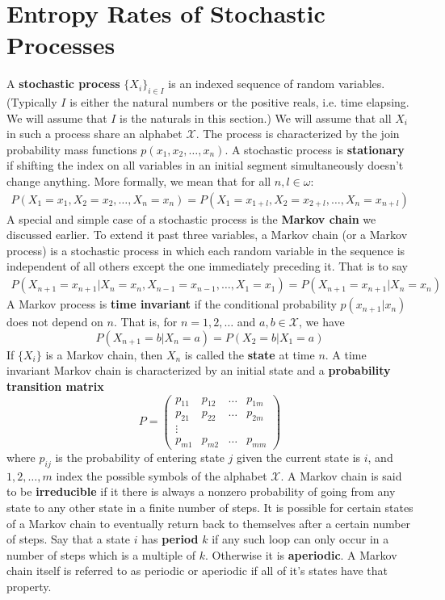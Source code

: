 \documentclass{article}
\theoremstyle{definition}
\theoremstyle{plain}
\begin{document}
\section{Entropy Rates of Stochastic Processes}
A \textbf{stochastic process} $\{X_i\}_{i \in I}$ is an indexed sequence of random variables. (Typically $I$ is either the natural numbers or the positive reals, i.e. time elapsing. We will assume that $I$ is the naturals in this section.) We will assume that all $X_i$ in such a process share an alphabet $\mathcal{X}$. The process is characterized by the join probability mass functions $p(x_1,x_2,\ldots,x_n)$. A stochastic process is \textbf{stationary} if shifting the index on all variables in an initial segment simultaneously doesn't change anything. More formally, we mean that for all $n,l \in \omega$:
\begin{align}
	P(X_1 = x_1,X_2 = x_2,\ldots,X_n = x_n) = P(X_1 = x_{1+l},X_2 = x_{2+l},\ldots,X_n = x_{n+l})
\end{align} 
A special and simple case of a stochastic process is the \textbf{Markov chain} we discussed earlier. To extend it past three variables, a Markov chain (or a Markov process) is a stochastic process in which each random variable in the sequence is independent of all others except the one immediately preceding it. That is to say
\begin{align}
	P(X_{n+1} = x_{n+1}|X_n = x_n,X_{n-1}=x_{n-1},\ldots,X_1 = x_1) = P(X_{n+1}=x_{n+1}|X_n = x_n)
\end{align}
A Markov process is \textbf{time invariant} if the conditional probability $p(x_{n+1}|x_n)$ does not depend on $n$. That is, for $n=1,2,\ldots$ and $a,b\in \mathcal{X}$, we have
\[ P(X_{n+1}=b|X_n=a) = P(X_2=b|X_1=a) \]
If $\{X_i\}$ is a Markov chain, then $X_n$ is called the \textbf{state} at time $n$. A time invariant Markov chain is characterized by an initial state and a \textbf{probability transition matrix}
\[ P = \begin{pmatrix} p_{11} & p_{12} & \ldots & p_{1m} \\
						p_{21} & p_{22} & \ldots & p_{2m} \\
						\vdots \\
						p_{m1} & p_{m2} & \ldots & p_{mm} \end{pmatrix} \]
where $p_{ij}$ is the probability of entering state $j$ given the current state is $i$, and $1,2,\ldots,m$ index the possible symbols of the alphabet $\mathcal{X}$. A Markov chain is said to be \textbf{irreducible} if it there is always a nonzero probability of going from any state to any other state in a finite number of steps. It is possible for certain states of a Markov chain to eventually return back to themselves after a certain number of steps. Say that a state $i$ has \textbf{period} $k$ if any such loop can only occur in a number of steps which is a multiple of $k$. Otherwise it is \textbf{aperiodic}. A Markov chain itself is referred to as periodic or aperiodic if all of it's states have that property. \par 
\end{document}
